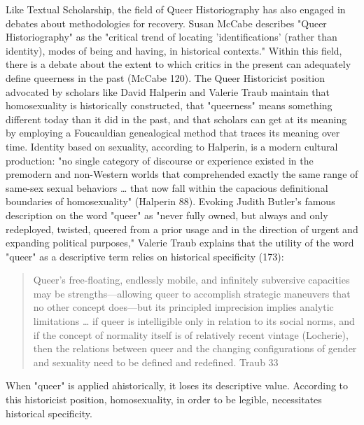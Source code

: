 \documentclass[11pt]{article}
\begin{document}
Like Textual Scholarship, the field of Queer Historiography has also
engaged in debates about methodologies for recovery. Susan McCabe
describes "Queer Historiography" as the "critical trend of locating
'identifications' (rather than identity), modes of being and having,
in historical contexts." Within this field, there is a debate about
the extent to which critics in the present can adequately define
queerness in the past (McCabe 120). The Queer Historicist position
advocated by scholars like David Halperin and Valerie Traub maintain
that homosexuality is historically constructed, that "queerness" means
something different today than it did in the past, and that scholars
can get at its meaning by employing a Foucauldian genealogical method
that traces its meaning over time. Identity based on sexuality,
according to Halperin, is a modern cultural production: "no single
category of discourse or experience existed in the premodern and
non-Western worlds that comprehended exactly the same range of
same-sex sexual behaviors \ldots{} that now fall within the capacious
definitional boundaries of homosexuality" (Halperin 88). Evoking
Judith Butler's famous description on the word "queer" as "never fully
owned, but always and only redeployed, twisted, queered from a prior
usage and in the direction of urgent and expanding political
purposes," Valerie Traub explains that the utility of the word "queer"
as a descriptive term relies on historical specificity (173):
\begin{quote}
Queer's free-floating, endlessly mobile, and infinitely subversive
capacities may be strengths---allowing queer to accomplish strategic
maneuvers that no other concept does---but its principled imprecision
implies analytic limitations \ldots{} if queer is intelligible only in
relation to its social norms, and if the concept of normality itself
is of relatively recent vintage (Locherie), then the relations between
queer and the changing configurations of gender and sexuality need to
be defined and redefined. Traub 33
\end{quote}
When "queer" is applied ahistorically, it loses its descriptive
value. According to this historicist position, homosexuality, in order
to be legible, necessitates historical specificity.
\end{document}
